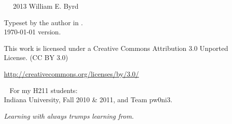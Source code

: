 \documentclass{book}
\newcommand{\blankpage}{\newpage\hbox{}\thispagestyle{empty}\newpage} %
\begin{document}
\begin{schemeregion}

\frontmatter
{} %



\blankpage




\newpage

~\vfill
\thispagestyle{empty}
\setlength{\parindent}{0pt}
\setlength{\parskip}{\baselineskip}
\large
\noindent
\textcopyright~2013 William E. Byrd

\noindent
Typeset by the author in \XeLaTeX. \\ %
\noindent
\today\xspace version.

\huge
\noindent
\ccLogo
\ccAttribution

\large
\noindent
This work is licensed under a Creative Commons Attribution 3.0 Unported License.
(CC BY 3.0)

\noindent
\url{http://creativecommons.org/licenses/by/3.0/}
\normalsize



\cleardoublepage
\thispagestyle{empty}
~\vfill
\Large
For my H211 students: \\Indiana University, Fall 2010 \& 2011, and Team pw0ni3.
\begin{flushright}
\vspace{5mm}
\textit{Learning with always trumps learning from.}


\end{flushright}
\end{schemeregion}
\end{document}
